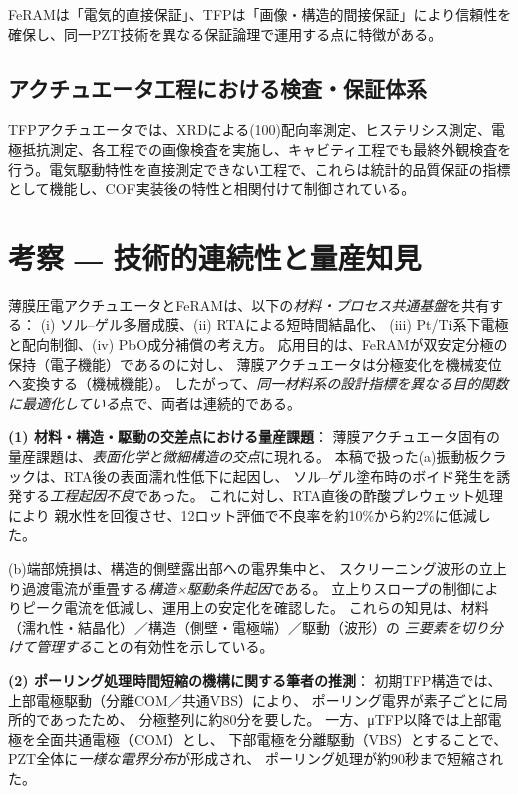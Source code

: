 \documentclass[conference]{IEEEtran}
\begin{document}
FeRAMは「電気的直接保証」、TFPは「画像・構造的間接保証」により信頼性を確保し、同一PZT技術を異なる保証論理で運用する点に特徴がある。

\subsection{アクチュエータ工程における検査・保証体系}
TFPアクチュエータでは、XRDによる(100)配向率測定、ヒステリシス測定、電極抵抗測定、各工程での画像検査を実施し、キャビティ工程でも最終外観検査を行う。電気駆動特性を直接測定できない工程で、これらは統計的品質保証の指標として機能し、COF実装後の特性と相関付けて制御されている。

\section{考察 ― 技術的連続性と量産知見}
薄膜圧電アクチュエータとFeRAMは、以下の\emph{材料・プロセス共通基盤}を共有する：
(i) ソル–ゲル多層成膜、(ii) RTAによる短時間結晶化、
(iii) Pt/Ti系下電極と配向制御、(iv) PbO成分補償の考え方\cite{bottaro1993solgel,scott2000review,damjanovic2010ferro}。
応用目的は、FeRAMが双安定分極の保持（電子機能）であるのに対し、
薄膜アクチュエータは分極変化を機械変位へ変換する（機械機能）。
したがって、\emph{同一材料系の設計指標を異なる目的関数に最適化している}点で、両者は連続的である。

\medskip
\noindent
\textbf{(1) 材料・構造・駆動の交差点における量産課題}：
薄膜アクチュエータ固有の量産課題は、\emph{表面化学と微細構造の交点}に現れる。
本稿で扱った(a)振動板クラックは、RTA後の表面濡れ性低下に起因し、
ソル–ゲル塗布時のボイド発生を誘発する\emph{工程起因不良}であった。
これに対し、RTA直後の酢酸プレウェット処理により
親水性を回復させ、12ロット評価で不良率を約10\%から約2\%に低減した。

(b)端部焼損は、構造的側壁露出部への電界集中と、
スクリーニング波形の立上り過渡電流が重畳する\emph{構造×駆動条件起因}である。
立上りスロープの制御によりピーク電流を低減し、運用上の安定化を確認した。
これらの知見は、材料（濡れ性・結晶化）／構造（側壁・電極端）／駆動（波形）の
\emph{三要素を切り分けて管理する}ことの有効性を示している。

\medskip
\noindent
\textbf{(2) ポーリング処理時間短縮の機構に関する筆者の推測}：
初期TFP構造では、上部電極駆動（分離COM／共通VBS）により、
ポーリング電界が素子ごとに局所的であったため、
分極整列に約80分を要した。
一方、μTFP以降では上部電極を全面共通電極（COM）とし、
下部電極を分離駆動（VBS）とすることで、
PZT全体に\emph{一様な電界分布}が形成され、
ポーリング処理が約90秒まで短縮された。
\end{document}
